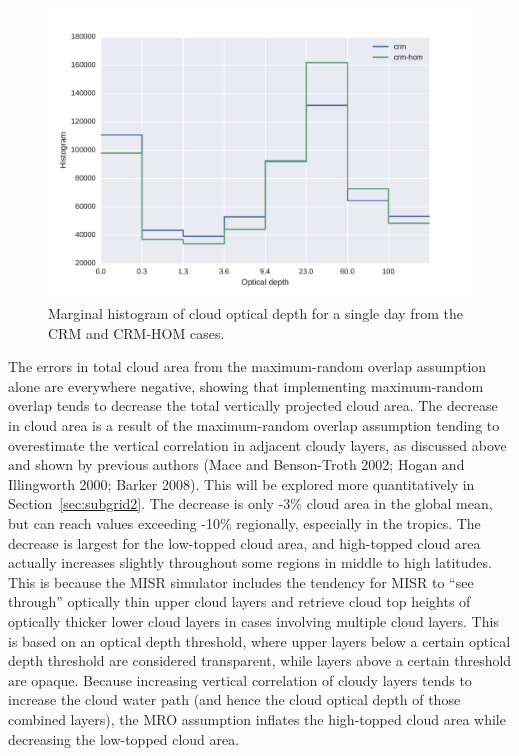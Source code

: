 \begin{figure}[htbp]
\centering
\includegraphics{graphics/taudist_hom.pdf}
\caption{\label{fig:subgrid1_cldtau_distribution}Marginal histogram of
cloud optical depth for a single day from the CRM and CRM-HOM
cases.}\label{fig:subgrid1ux5fcldtauux5fdistribution}
\end{figure}

The errors in total cloud area from the maximum-random overlap
assumption alone are everywhere negative, showing that implementing
maximum-random overlap tends to decrease the total vertically projected
cloud area. The decrease in cloud area is a result of the maximum-random
overlap assumption tending to overestimate the vertical correlation in
adjacent cloudy layers, as discussed above and shown by previous authors
(Mace and Benson-Troth 2002; Hogan and Illingworth 2000; Barker 2008).
This will be explored more quantitatively in Section~\ref{sec:subgrid2}.
The decrease is only -3\% cloud area in the global mean, but can reach
values exceeding -10\% regionally, especially in the tropics. The
decrease is largest for the low-topped cloud area, and high-topped cloud
area actually increases slightly throughout some regions in middle to
high latitudes. This is because the MISR simulator includes the tendency
for MISR to ``see through'' optically thin upper cloud layers and
retrieve cloud top heights of optically thicker lower cloud layers in
cases involving multiple cloud layers. This is based on an optical depth
threshold, where upper layers below a certain optical depth threshold
are considered transparent, while layers above a certain threshold are
opaque. Because increasing vertical correlation of cloudy layers tends
to increase the cloud water path (and hence the cloud optical depth of
those combined layers), the MRO assumption inflates the high-topped
cloud area while decreasing the low-topped cloud area.

